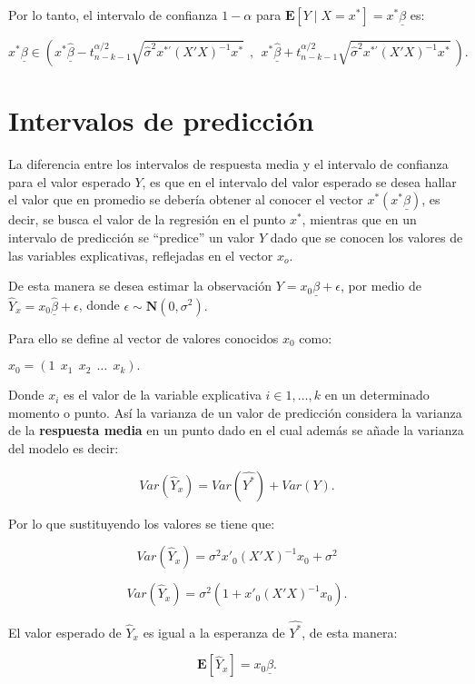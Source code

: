 \documentclass[
  a4paper,
  oneside,
  openany]{book}
\begin{document}
Por lo tanto, el intervalo de confianza \(1-\alpha\) para \(\mathbf{E}[Y \mid X=x^*]=x^*\underline{\beta}\) es:

\[x^*\underline{\beta} \in \left(x^*\underline{\hat{\beta}}-t^{\alpha/2}_{n-k-1}\sqrt{\hat{\sigma}^2 x^{*'}(X'X)^{-1}x^*} \ \ , \ \ x^*\underline{\hat{\beta}}+t^{\alpha/2}_{n-k-1}\sqrt{\hat{\sigma}^2 x^{*'}(X'X)^{-1}x^*} \ \right).\]

\hypertarget{intervalos-de-predicciuxf3n}{%
\section{Intervalos de predicción}\label{intervalos-de-predicciuxf3n}}

La diferencia entre los intervalos de respuesta media y el intervalo de confianza para el valor esperado \(Y\), es que en el intervalo del valor esperado se desea hallar el valor que en promedio se debería obtener al conocer el vector \(x^*(x^*\underline{\beta})\), es decir, se busca el valor de la regresión en el punto \(x^*\), mientras que en un intervalo de predicción se ``predice'' un valor \(Y\) dado que se conocen los valores de las variables explicativas, reflejadas en el vector \(x_{o}\).

De esta manera se desea estimar la observación \(Y=x_{0}\underline{\beta}+\epsilon\), por medio de \(\hat{Y}_{x}=x_{0}\underline{\hat{\beta}}+\epsilon\), donde \(\epsilon \sim \mathbf{N} (0, \sigma^2).\)

Para ello se define al vector de valores conocidos \(x_{0}\) como:

\(x_{0}=\left( 1 \ \ x_{1} \ \ x_{2} \ \ \ldots \ \ x_{k} \right).\)

Donde \(x_{i}\) es el valor de la variable explicativa \(i \in 1, \ldots,k\) en un determinado momento o punto. Así la varianza de un valor de predicción considera la varianza de la \textbf{respuesta media} en un punto dado en el cual además se añade la varianza del modelo es decir:

\[Var(\hat{Y}_{x})=Var(\hat{Y^*})+Var(Y).\]

Por lo que sustituyendo los valores se tiene que:

\[Var(\hat{Y}_{x})=\sigma^2x'_{0}(X'X)^{-1}x_{0}+\sigma^2\]

\[Var(\hat{Y}_{x})=\sigma^2\left(1+x'_{0}(X'X)^{-1}x_{0}\right).\]

El valor esperado de \(\hat{Y}_{x}\) es igual a la esperanza de \(\hat{Y^*}\), de esta manera:

\[\mathbf{E}[\hat{Y}_{x}]=x_{0}\underline{\beta}.\]
\end{document}
